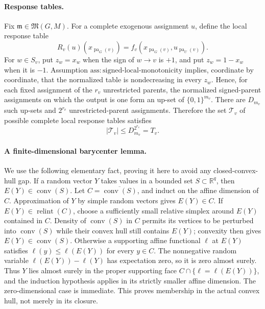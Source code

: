 \paragraph{Response tables.}
Fix \(\mathfrak m\in\mathfrak M(G,M)\).  For a complete exogenous assignment \(u\), define the local response table
\[
 R_v(u)(x_{\operatorname{pa}_G(v)})
 =f_v(x_{\operatorname{pa}_G(v)},u_{\operatorname{pa}_U(v)}).
\]
For \(w\in S_v\), put \(z_w=x_w\) when the sign of \(w\to v\) is \(+1\), and put \(z_w=1-x_w\) when it is \(-1\).  Assumption \(\mathrm{ass:signed\text{-}local\text{-}monotonicity}\) implies, coordinate by coordinate, that the normalized table is nondecreasing in every \(z_w\).  Hence, for each fixed assignment of the \(r_v\) unrestricted parents, the normalized signed-parent assignments on which the output is one form an up-set of \(\{0,1\}^{m_v}\).  There are \(D_{m_v}\) such up-sets and \(2^{r_v}\) unrestricted-parent assignments.  Therefore the set \(\mathcal T_v\) of possible complete local response tables satisfies
\[
 |\mathcal T_v|\le D_{m_v}^{2^{r_v}}=T_v.
\]

\paragraph{A finite-dimensional barycenter lemma.}
We use the following elementary fact, proving it here to avoid any closed-convex-hull gap.  If a random vector \(Y\) takes values in a bounded set \(S\subset\mathbb R^q\), then \(E(Y)\in\operatorname{conv}(S)\).  Let \(C=\overline{\operatorname{conv}(S)}\), and induct on the affine dimension of \(C\).  Approximation of \(Y\) by simple random vectors gives \(E(Y)\in C\).  If \(E(Y)\in\operatorname{relint}(C)\), choose a sufficiently small relative simplex around \(E(Y)\) contained in \(C\).  Density of \(\operatorname{conv}(S)\) in \(C\) permits its vertices to be perturbed into \(\operatorname{conv}(S)\) while their convex hull still contains \(E(Y)\); convexity then gives \(E(Y)\in\operatorname{conv}(S)\).  Otherwise a supporting affine functional \(\ell\) at \(E(Y)\) satisfies \(\ell(y)\le \ell(E(Y))\) for every \(y\in C\).  The nonnegative random variable \(\ell(E(Y))-\ell(Y)\) has expectation zero, so it is zero almost surely.  Thus \(Y\) lies almost surely in the proper supporting face \(C\cap\{\ell=\ell(E(Y))\}\), and the induction hypothesis applies in its strictly smaller affine dimension.  The zero-dimensional case is immediate.  This proves membership in the actual convex hull, not merely in its closure.

